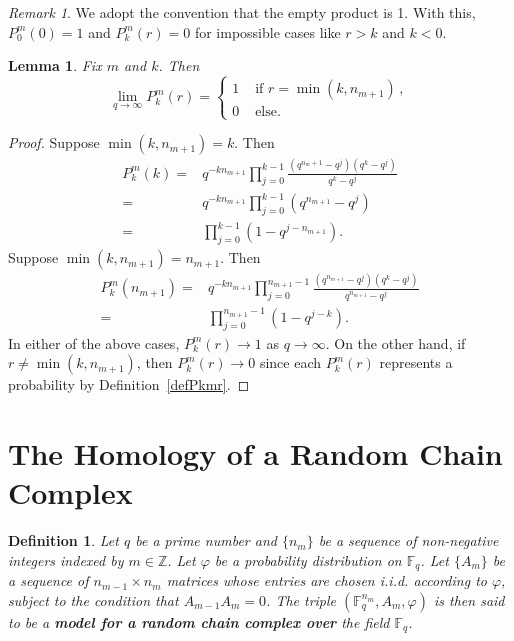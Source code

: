 \documentclass[3p,times]{elsarticle}
\newtheorem{lemma}[theorem]{Lemma}
\newtheorem{definition}[theorem]{Definition}
\theoremstyle{remark}
\newtheorem{remark}[theorem]{Remark}
\newcommand{\Z}{\mathbb{Z}}
\newcommand\Fqn[1]{\mathbb{F}_q^{#1}}
\newcommand{\ra}{\rightarrow}
\begin{document}
\begin{remark}
  We adopt the convention that the empty product is 1. With this,
  $P^m_0(0) = 1$ and $P^m_k(r) = 0$ for impossible cases like $r>k$ and $k < 0$.
\end{remark}

\begin{lemma}
  \label{lem:Pqtoinfty}
  Fix $m$ and $k$. Then 
  \[
    \lim_{q \ra \infty} P^m_k(r) = 
      \begin{cases}
        1 & \mbox{ if } r = \min(k,n_{m+1}) \, , \\
        0 & \mbox { else.}
      \end{cases}
    \]
\end{lemma}

\begin{proof}
  Suppose $\min(k,n_{m+1}) = k$. Then 
  \begin{align*} 
    P^m_k(k) =& q^{-kn_{m+1}}\prod_{j=0}^{k-1} \frac{(q^{n_m+1}-q^j) (q^k - q^j)}{q^k - q^j}  \\
    =& q^{-kn_{m+1}} \prod_{j=0}^{k-1}(q^{n_{m+1}} - q^j) \\
    =& \prod_{j=0}^{k-1} (1-q^{j-n_{m+1}}).
  \end{align*}
  Suppose $\min(k,n_{m+1}) = n_{m+1}$. Then
  \begin{align*}
    P^m_k(n_{m+1}) 
    =& q^{-kn_{m+1}}\prod_{j=0}^{n_{m+1}-1} \frac{(q^{n_{m+1}} - q^j)(q^k - q^j)}{q^{n_{m+1}} - q^j}    \\
    =&  \prod_{j=0}^{n_{m+1}-1}(1-q^{j-k}).
	\end{align*}
    In either of the above cases, $P^m_k(r) \ra 1$ as $q \ra \infty$. On the other hand, 
    if $r \neq \min(k,n_{m+1})$, then $P^m_k(r) \ra 0$ since each $P^m_k(r)$ represents
    a probability by Definition~\ref{defPkmr}.
\end{proof}


\section{The Homology of a Random Chain Complex}
\label{SecCondComp}

\begin{definition}
  Let $q$ be a prime number and $\{n_m\}$ be a sequence of non-negative integers indexed by $m \in \Z$. Let $\varphi$ be a probability distribution on $\Fqn{}$. Let $\{A_m\}$ be a sequence of $n_{m-1}\times n_{m}$ matrices whose entries are chosen i.i.d. according to $\varphi$, subject to the condition that $A_{m-1}A_m = 0$.  The triple $(\Fqn{n_m},A_m,\varphi)$ is then said to be a {\bf  model for a random chain complex over} the field $\Fqn{}$.
\end{definition}
\end{document}
